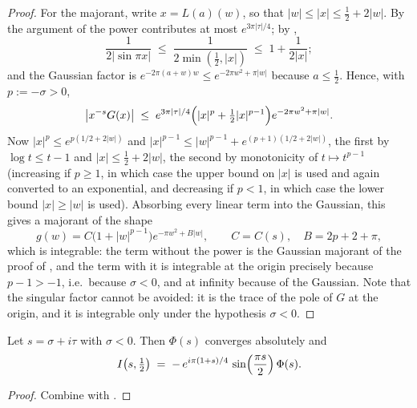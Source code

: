 \begin{proof}
For the majorant, write $x=L(a)(w)$, so that $\lvert w\rvert\le\lvert x\rvert\le\tfrac12+2\lvert w\rvert$.
By  the argument of the power contributes at most
$e^{3\pi\lvert\tau\rvert/4}$; by ,
\[
  \frac1{2\lvert\sin\pi x\rvert}\;\le\;\frac1{2\min(\tfrac12,\lvert x\rvert)}\;\le\;1+\frac1{2\lvert x\rvert};
\]
and the Gaussian factor is $e^{-2\pi(a+w)w}\le e^{-2\pi w^{2}+\pi\lvert w\rvert}$ because
$a\le\tfrac12$.  Hence, with $p:=-\sigma>0$,
\[
  \bigl\lvert x^{-s}G(x)\bigr\rvert\;\le\;e^{3\pi\lvert\tau\rvert/4}
     \Bigl(\lvert x\rvert^{p}+\tfrac12\lvert x\rvert^{p-1}\Bigr)e^{-2\pi w^{2}+\pi\lvert w\rvert}.
\]
Now $\lvert x\rvert^{p}\le e^{p(1/2+2\lvert w\rvert)}$ and
$\lvert x\rvert^{p-1}\le\lvert w\rvert^{p-1}+e^{(p+1)(1/2+2\lvert w\rvert)}$, the first by
$\log t\le t-1$ and $\lvert x\rvert\le\tfrac12+2\lvert w\rvert$, the second by monotonicity of
$t\mapsto t^{p-1}$ (increasing if $p\ge1$, in which case the upper bound on $\lvert x\rvert$ is
used and again converted to an exponential, and decreasing if $p<1$, in which case the lower bound
$\lvert x\rvert\ge\lvert w\rvert$ is used).  Absorbing every linear term into the Gaussian, this
gives a majorant of the shape
\[
  g(w)=C\bigl(1+\lvert w\rvert^{p-1}\bigr)e^{-\pi w^{2}+B\lvert w\rvert},
  \qquad C=C(s),\quad B=2p+2+\pi,
\]
which is integrable: the term without the power is the Gaussian majorant of the proof of
, and the term with it
is integrable at the origin precisely because $p-1>-1$, i.e.\ because $\sigma<0$, and at infinity
because of the Gaussian.  Note that the singular factor cannot be avoided: it is the trace of the
pole of $G$ at the origin, and it is integrable only under the hypothesis $\sigma<0$.
\end{proof}

\begin{lemma}
\label{lem:rsz_hankel}
\leanok
{}
Let $s=\sigma+i\tau$ with $\sigma<0$.  Then $\Phi(s)$ converges absolutely and
\[
  I\bigl(s,\tfrac12\bigr)\;=\;-\,e^{i\pi(1+s)/4}\,\sin\Bigl(\frac{\pi s}{2}\Bigr)\,\Phi(s).
\]
\end{lemma}

\begin{proof}
\leanok
{}
Combine  with .
\end{proof}

